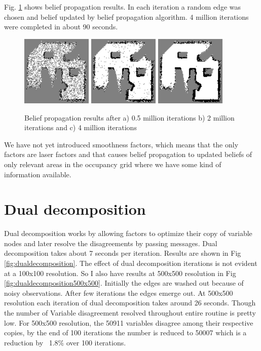 \documentclass[10pt,oneside,letterpaper]{article}
\begin{document}
Fig. \ref{fig:bpresults} shows belief propagation results. In each iteration a random edge was chosen and belief updated by belief propagation algorithm. 4 million iterations were completed in about 90 seconds.
\begin{figure}
  \includegraphics[width=0.3\textwidth]{bpresults_100x100_50.png}
  \includegraphics[width=0.3\textwidth]{bpresults_100x100_200.png}
  \includegraphics[width=0.3\textwidth]{beliefpropagation_results_100x100.png}
  \caption{Belief propagation results after a) 0.5 million iterations b) 2 million iterations and c) 4 million iterations}
  \label{fig:bpresults}
\end{figure}

We have not yet introduced smoothness factors, which means that the only factors are laser factors and that causes belief propagation to updated beliefs of only relevant areas in the occupancy grid where we have some kind of information available.

\section{Dual decomposition}
Dual decomposition works by allowing factors to optimize their copy of variable nodes and later resolve the disagreements by passing messages.  Dual decomposition takes about 7 seconds per iteration. Results are shown in Fig \ref{fig:dualdecomposition}. The effect of dual decomposition iterations is not evident at a 100x100 resolution. So I also have results at 500x500 resolution in Fig \ref{fig:dualdecomposition500x500}. Initially the edges are washed out because of noisy observations. After few iterations the edges emerge out. At 500x500 resolution each iteration of dual decomposition takes around 26 seconds. Though the number of Variable disagreement resolved throughout entire routine is pretty low. For 500x500 resolution, the 50911 variables disagree among their respective copies, by the end of 100 iterations the number is reduced to 50007 which is a reduction by ~1.8\% over 100 iterations. 
\end{document}

